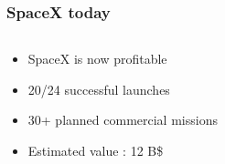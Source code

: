 {
    \logo{}
\begin{frame}
    \frametitle{SpaceX today}
    \begin{columns}
        \begin{column}{60mm}
            \begin{itemize}
                \item SpaceX is now profitable
                \item 20/24 successful launches
                \item 30+ planned commercial missions
                \item Estimated value : 12 B\$
            \end{itemize}
        \end{column}
        \begin{column}{40mm}
        \end{column}
    \end{columns}
\end{frame}
}

\begin{frame}
\end{frame}

\begin{frame}
\end{frame}

